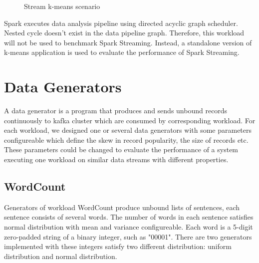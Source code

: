  \begin{figure}
  \begin{center}
   \caption{Stream k-means scenario}
   \label{fig:iterator_operator}
  \end{center}
\end{figure}

Spark executes data analysis pipeline using directed acyclic graph scheduler.  Nested cycle doesn't exist in the data pipeline graph. Therefore, this workload will not be used to benchmark Spark Streaming. Instead, a standalone version of k-means application is used to evaluate the performance of Spark Streaming.

\section{Data Generators}
\label{section:data_generator}
 A data generator is a program that produces and sends unbound records continuously to kafka cluster which are consumed by corresponding workload. For each workload, we designed one or several data generators with some parameters configureable which define the skew in record popularity, the size of records etc. These parameters could be changed to evaluate the performance of a system executing one workload on similar data streams with different properties. 

\subsection{WordCount}

Generators of workload WordCount produce unbound lists of sentences, each sentence consists of several words. The number of words in each sentence satisfies normal distribution with mean and variance configureable. Each word is a 5-digit zero-padded string of a binary integer, such as "00001". There are two generators implemented with these integers satisfy two different distribution: uniform distribution and normal distribution.


